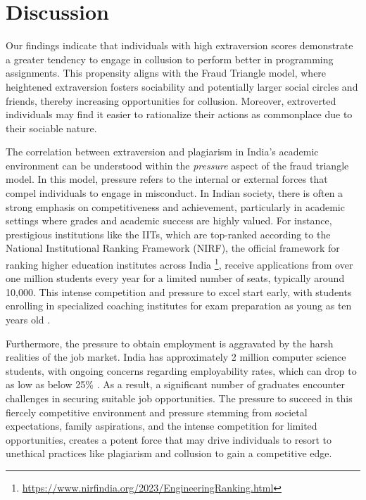 \section{Discussion} \label{sec:discuss}

Our findings indicate that individuals with high extraversion scores demonstrate a greater tendency to engage in collusion to perform better in programming assignments. This propensity aligns with the Fraud Triangle model, where heightened extraversion fosters sociability and potentially larger social circles and friends, thereby increasing opportunities for collusion. Moreover, extroverted individuals may find it easier to rationalize their actions as commonplace due to their sociable nature.

The correlation between extraversion and plagiarism in India's academic environment can be understood within the \textit{pressure} aspect of the fraud triangle model. In this model, pressure refers to the internal or external forces that compel individuals to engage in misconduct. In Indian society, there is often a strong emphasis on competitiveness and achievement, particularly in academic settings where grades and academic success are highly valued. For instance, prestigious institutions like the IITs, which are top-ranked according to the National Institutional Ranking Framework (NIRF), the official framework for ranking higher education institutes across India \footnote{\url{https://www.nirfindia.org/2023/EngineeringRanking.html}}, receive applications from over one million students every year for a limited number of seats, typically around 10,000. This intense competition and pressure to excel start early, with students enrolling in specialized coaching institutes for exam preparation as young as ten years old \cite{IITPrepMenace}. 

Furthermore, the pressure to obtain employment is aggravated by the harsh realities of the job market. India has approximately 2 million computer science students, with ongoing concerns regarding employability rates, which can drop to as low as below 25\% \cite{UnemploymentIndia, NAIR2020831}. As a result, a significant number of graduates encounter challenges in securing suitable job opportunities. The pressure to succeed in this fiercely competitive environment and pressure stemming from societal expectations, family aspirations, and the intense competition for limited opportunities, creates a potent force that may drive individuals to resort to unethical practices like plagiarism and collusion to gain a competitive edge. 


